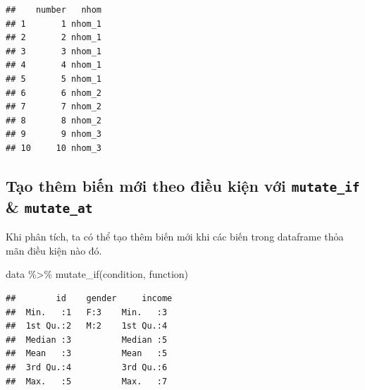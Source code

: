 \documentclass[]{krantz}
\makeatletter
\newenvironment{Shaded}{\begin{snugshade}}{\end{snugshade}}
\newcommand{\CommentTok}[1]{\textcolor[rgb]{0.37,0.37,0.37}{\textit{#1}}}
\newcommand{\DataTypeTok}[1]{\textcolor[rgb]{0.27,0.27,0.27}{#1}}
\newcommand{\DecValTok}[1]{\textcolor[rgb]{0.06,0.06,0.06}{#1}}
\newcommand{\KeywordTok}[1]{\textcolor[rgb]{0.27,0.27,0.27}{\textbf{#1}}}
\newcommand{\NormalTok}[1]{#1}
\newcommand{\OperatorTok}[1]{\textcolor[rgb]{0.43,0.43,0.43}{\textbf{#1}}}
\newcommand{\StringTok}[1]{\textcolor[rgb]{0.5,0.5,0.5}{#1}}
\renewenvironment{quote}{\begin{VF}}{\end{VF}}
\newenvironment{kframe}{%
\medskip{}
\setlength{\fboxsep}{.8em}
 \def\at@end@of@kframe{}%
 \ifinner\ifhmode%
  \def\at@end@of@kframe{\end{minipage}}%
  \begin{minipage}{\columnwidth}%
 \fi\fi%
 \def\FrameCommand##1{\hskip\@totalleftmargin \hskip-\fboxsep
 \colorbox{shadecolor}{##1}\hskip-\fboxsep
     \hskip-\linewidth \hskip-\@totalleftmargin \hskip\columnwidth}%
 \MakeFramed {\advance\hsize-\width
   \@totalleftmargin\z@ \linewidth\hsize
   \@setminipage}}%
 {\par\unskip\endMakeFramed%
 \at@end@of@kframe}
\renewenvironment{Shaded}{\begin{kframe}}{\end{kframe}}
\renewenvironment{Shaded}{\begin{snugshade}}{\end{snugshade}}
\renewcommand{\CommentTok}[1]{\textcolor[rgb]{0.56,0.35,0.01}{\textit{#1}}}
\renewcommand{\DataTypeTok}[1]{\textcolor[rgb]{0.13,0.29,0.53}{#1}}
\renewcommand{\DecValTok}[1]{\textcolor[rgb]{0.00,0.00,0.81}{#1}}
\renewcommand{\KeywordTok}[1]{\textcolor[rgb]{0.13,0.29,0.53}{\textbf{#1}}}
\renewcommand{\NormalTok}[1]{#1}
\renewcommand{\OperatorTok}[1]{\textcolor[rgb]{0.81,0.36,0.00}{\textbf{#1}}}
\renewcommand{\StringTok}[1]{\textcolor[rgb]{0.31,0.60,0.02}{#1}}
\theoremstyle{definition}
\theoremstyle{definition}
\theoremstyle{definition}
\theoremstyle{remark}
\makeatother
\begin{document}
\begin{verbatim}
##    number   nhom
## 1       1 nhom_1
## 2       2 nhom_1
## 3       3 nhom_1
## 4       4 nhom_1
## 5       5 nhom_1
## 6       6 nhom_2
## 7       7 nhom_2
## 8       8 nhom_2
## 9       9 nhom_3
## 10     10 nhom_3
\end{verbatim}

\hypertarget{tao-them-bin-mi-theo-iu-kin-vi-mutate_if-mutate_at}{%
\subsection{\texorpdfstring{Tạo thêm biến mới theo điều kiện với
\texttt{mutate\_if} \&
\texttt{mutate\_at}}{Tạo thêm biến mới theo điều kiện với mutate\_if \& mutate\_at}}\label{tao-them-bin-mi-theo-iu-kin-vi-mutate_if-mutate_at}}

Khi phân tích, ta có thể tạo thêm biến mới khi các biến trong dataframe
thỏa mãn điều kiện nào đó.

\begin{quote}
data \%\textgreater{}\% mutate\_if(condition, function)
\end{quote}

\begin{Shaded}
\end{Shaded}

\begin{verbatim}
##        id    gender     income 
##  Min.   :1   F:3    Min.   :3  
##  1st Qu.:2   M:2    1st Qu.:4  
##  Median :3          Median :5  
##  Mean   :3          Mean   :5  
##  3rd Qu.:4          3rd Qu.:6  
##  Max.   :5          Max.   :7
\end{verbatim}

\begin{Shaded}
\end{Shaded}
\end{document}
